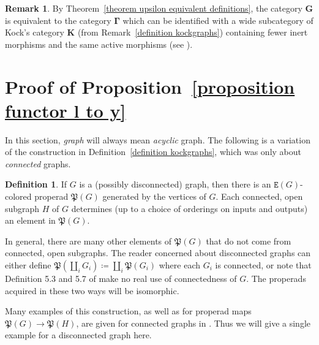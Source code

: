 \documentclass{amsart}
\numberwithin{theorem}{subsection}
\theoremstyle{definition}
\newtheorem{definition}[theorem]{Definition}
\newtheorem{remark}[theorem]{Remark}
\newcommand{\bbY}{\mathbf{G}}
\newcommand{\hryGamma}{\mathbf{\Gamma}}
\newcommand{\kockgraphs}{\mathbf{K}}
\newcommand{\edge}{\mathtt{E}}
\begin{document}
\begin{remark}
By Theorem~\ref{theorem upsilon equivalent definitions}, the category $\bbY$ is equivalent to the category $\hryGamma$ which can be identified with a wide subcategory of Kock's category $\kockgraphs$ (from Remark~\ref{definition kockgraphs}) containing fewer inert morphisms and the same active morphisms (see \cite[2.4.14]{Kock_Properads}).
\end{remark}




\section{Proof of Proposition~\ref{proposition functor l to y}}\label{appendix proof l to y}

In this section, \emph{graph} will always mean \emph{acyclic} graph.
The following is a variation of the construction in Definition~\ref{definition kockgraphs}, which was only about \emph{connected} graphs.
\begin{definition}\label{def properad genned by graph}
If $G$ is a (possibly disconnected) graph, then there is an $\edge(G)$-colored properad $\mathfrak{P}(G)$ generated by the vertices of $G$.
Each connected, open subgraph $H$ of $G$ determines (up to a choice of orderings on inputs and outputs) an element in $\mathfrak{P}(G)$.
\end{definition} 
In general, there are many other elements of $\mathfrak{P}(G)$ that do not come from connected, open subgraphs.
The reader concerned about disconnected graphs can either define $\mathfrak{P}(\coprod_i G_i) \coloneqq \coprod_i \mathfrak{P}(G_i)$ where each $G_i$ is connected, or note that Definition 5.3 and 5.7 of \cite{hrybook} make no real use of connectedness of $G$.
The properads acquired in these two ways will be isomorphic.

Many examples of this construction, as well as for properad maps $\mathfrak{P}(G) \to \mathfrak{P}(H)$, are given for connected graphs in \cite[Chapter 5]{hrybook}.
Thus we will give a single example for a disconnected graph here.

\newcommand{\coloredone}{{\color[HTML]{006666}1}}
\newcommand{\coloredtwo}{{\color[HTML]{999933}2}}
\newcommand{\coloredthree}{{\color[HTML]{3333CC}3}}
\newcommand{\coloredfour}{{\color[HTML]{990099}4}}
\newcommand{\coloredfive}{{\color[HTML]{336600}5}}
\newcommand{\coloredsix}{{\color[HTML]{990000}6}}
\end{document}
